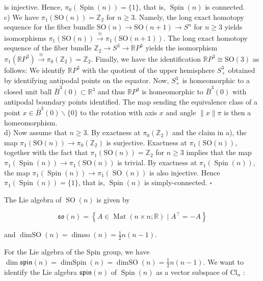 \documentclass[10pt, letterpaper]{article}
\begin{document}
is injective. Hence, $\pi_{0}(\operatorname{Spin}(n))=\{1\}$, that is, $\operatorname{Spin}(n)$ is connected.\\
c) We have $\pi_{1}(\mathrm{SO}(n))=\mathbb{Z}_{2}$ for $n \geq 3$. Namely, the long exact homotopy sequence for the fiber bundle $\mathrm{SO}(n) \rightarrow \mathrm{SO}(n+1) \rightarrow S^{n}$ for $n \geq 3$ yields isomorphisms $\pi_{1}(\mathrm{SO}(n)) \xrightarrow{\cong} \pi_{1}(\mathrm{SO}(n+1))$. The long exact homotopy sequence of the fiber bundle $\mathbb{Z}_{2} \rightarrow S^{3} \rightarrow \mathbb{R} P^{3}$ yields the isomorphism $\pi_{1}\left(\mathbb{R} P^{3}\right) \stackrel{\cong}{\rightarrow} \pi_{0}\left(\mathbb{Z}_{2}\right)=\mathbb{Z}_{2}$. Finally, we have the identification $\mathbb{R} P^{3} \cong \mathrm{SO}(3)$ as follows: We identify $\mathbb{R} P^{3}$ with the quotient of the upper hemisphere $S_{+}^{3}$ obtained by identifying antipodal points on the equator. Now, $S_{+}^{3}$ is homeomorphic to a closed unit ball $\bar{B}^{3}(0) \subset \mathbb{R}^{3}$ and thus $\mathbb{R} P^{3}$ is homeomorphic to $\bar{B}^{3}(0)$ with antipodal boundary points identified. The map sending the equivalence class of a point $x \in \bar{B}^{3}(0) \backslash\{0\}$ to the rotation with axis $x$ and angle $\|x\| \pi$ is then a homeomorphism.\\
d) Now assume that $n \geq 3$. By exactness at $\pi_{0}\left(\mathbb{Z}_{2}\right)$ and the claim in a), the map $\pi_{1}(\mathrm{SO}(n)) \rightarrow \pi_{0}\left(\mathbb{Z}_{2}\right)$ is surjective. Exactness at $\pi_{1}(\mathrm{SO}(n))$, together with the fact that $\pi_{1}(\mathrm{SO}(n))=\mathbb{Z}_{2}$ for $n \geq 3$ implies that the map $\pi_{1}(\operatorname{Spin}(n)) \rightarrow \pi_{1}(\mathrm{SO}(n))$ is trivial. By exactness at $\pi_{1}(\operatorname{Spin}(n))$, the map $\pi_{1}(\operatorname{Spin}(n)) \rightarrow \pi_{1}(\operatorname{SO}(n))$ is also injective. Hence $\pi_{1}(\operatorname{Spin}(n))=\{1\}$, that is, $\operatorname{Spin}(n)$ is simply-connected. \(\square\)

The Lie algebra of $\operatorname{SO}(n)$ is given by

$$
\mathfrak{s o}(n)=\left\{A \in \operatorname{Mat}(n \times n ; \mathbb{R}) \mid A^{\top}=-A\right\}
$$

and $\operatorname{dimSO}(n)=\operatorname{dimso}(n)=\frac{1}{2} n(n-1)$.

For the Lie algebra of the Spin group, we have $\operatorname{dim} \mathfrak{s p i n}(n)=\operatorname{dimSpin}(n)=\operatorname{dimSO}(n)= \frac{1}{2} n(n-1)$. We want to identify the Lie algebra $\mathfrak{s p i n}(n)$ of $\operatorname{Spin}(n)$ as a vector subspace of $\mathrm{Cl}_{n}$ :
\end{document}
